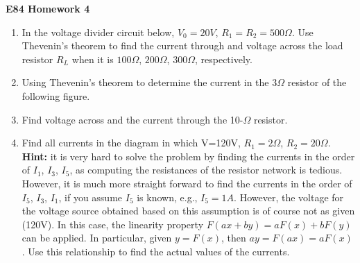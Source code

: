 \usepackage{html}

\begin{center}
{\Large \bf E84 Homework 4}
\end{center}
\begin{enumerate}

\begin{enumerate}

\item In the voltage divider circuit below, $V_0=20V$, $R_1=R_2=500\Omega$. 
Use Thevenin's theorem to find the current through and voltage across the 
load resistor $R_L$ when it is $100\Omega$, $200\Omega$, $300\Omega$, 
respectively.



\item Using Thevenin's theorem to determine the current in the $3\Omega$ 
resistor of the following figure.



\item Find voltage across and the current through the 10-$\Omega$ resistor.




\item 

Find all currents in the diagram in which V=120V, $R_1=2\Omega$, $R_2=20\Omega$. 
{\bf Hint:} it is very hard to solve the problem by finding the currents in the
order of $I_1$, $I_3$, $I_5$, as computing the resistances of the resistor 
network is tedious. However, it is much more straight forward to find the 
currents in the order of $I_5$, $I_3$, $I_1$, if you assume $I_5$ is known, e.g.,
$I_5=1A$. However, the voltage for the voltage source obtained based on this 
assumption is of course not as given (120V). In this case, the linearity property
$F(ax+by)=aF(x)+bF(y)$ can be applied. In particular, given $y=F(x)$, then 
$ay=F(ax)=aF(x)$. Use this relationship to find the actual values of the 
currents.


\end{enumerate}
\end{enumerate}

